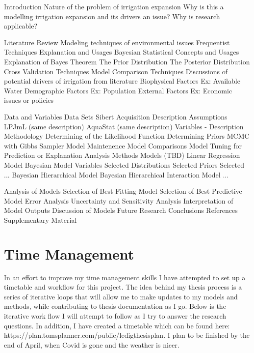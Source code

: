 \documentclass[12pt]{extarticle}
\begin{document}
\begin{outline}[enumerate]

   \1 Introduction
        \2 Nature of the problem of irrigation expansion
        \2 Why is this a modelling irrigation expansion and its drivers an issue? 
        \2 Why is research applicable? 
    
    \1 Literature Review
        \2 Modeling techniques of environmental issues
            \3 Frequentist Techniques Explanation and Usages
            \3 Bayesian Statistical Concepts and Usages
                    \4 Explanation of Bayes Theorem
                    \4 The Prior Distribution
                    \4 The Posterior Distribution
                    \4 Cross Validation Techniques
                    \4 Model Comparison Techniques
        \2 Discussions of potential drivers of irrigation from literature 
            \3 Biophysical Factors
                \4Ex: Available Water
            \3 Demographic Factors
                \4Ex: Population
            \3 External Factors
                \4Ex: Economic issues or policies

    \1 Data and Variables
        \2 Data Sets
            \3 Sibert
                \4 Acquisition
                \4 Description 
                \4 Assumptions 
            \3 LPJmL (same description)
            \3 AquaStat (same description)
        \2 Variables - Description
    \1 Methodology
        \2 Determining of the Likelihood Function
        \2 Determining Priors
        \2 MCMC with Gibbs Sampler
        \2 Model Maintenence
        \2 Model Comparisons
        \2 Model Tuning for Prediction or Explanation
        \2 Analysis Methods
    \1 Models (TBD)
        \2 Linear Regression Model
        \2 Bayesian Model 
            \3 Variables Selected
            \3 Distributions Selected
            \3 Priors Selected
            \3 ...
        \2 Bayesian Hierarchical Model 
        \2 Bayesian Hierarchical Interaction Model
        \2 ...


    \1 Analysis of Models
        \2 Selection of Best Fitting Model
        \2 Selection of Best Predictive Model
        \2 Error Analysis
        \2 Uncertainty and Sensitivity Analysis
        \2 Interpretation of Model Outputs
    \1 Discussion of Models
    \1 Future Research
    \1 Conclusions
    \1 References
    \1 Supplementary Material
\end{outline}

\section{Time Management}
In an effort to improve my time management skills I have attempted to set up a timetable and workflow for this project. The idea behind my thesis process is a series of iterative loops that will allow me to make updates to my models and methods, while contributing to thesis documentation as I go. Below is the iterative work flow I will attempt to follow as I try to answer the research questions. In addition, I have created a timetable which can be found here: https://plan.tomsplanner.com/public/ledigthesisplan. I plan to be finished by the end of April, when Covid is gone and the weather is nicer. 
\end{document}
